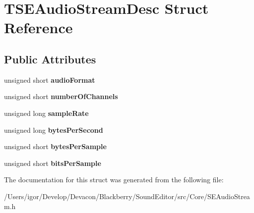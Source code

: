 \hypertarget{struct_t_s_e_audio_stream_desc}{\section{T\+S\+E\+Audio\+Stream\+Desc Struct Reference}
\label{struct_t_s_e_audio_stream_desc}
}
\subsection*{Public Attributes}
\begin{DoxyCompactItemize}
\item 
\hypertarget{struct_t_s_e_audio_stream_desc_a445b2e676e52f5a895210747cb799dde}{unsigned short {\bfseries audio\+Format}}\label{struct_t_s_e_audio_stream_desc_a445b2e676e52f5a895210747cb799dde}

\item 
\hypertarget{struct_t_s_e_audio_stream_desc_ae7893c4aaf66e0d9042bfda1ad602a21}{unsigned short {\bfseries number\+Of\+Channels}}\label{struct_t_s_e_audio_stream_desc_ae7893c4aaf66e0d9042bfda1ad602a21}

\item 
\hypertarget{struct_t_s_e_audio_stream_desc_a1088958be0c2d74002d679794ee4b334}{unsigned long {\bfseries sample\+Rate}}\label{struct_t_s_e_audio_stream_desc_a1088958be0c2d74002d679794ee4b334}

\item 
\hypertarget{struct_t_s_e_audio_stream_desc_ad90671d7b383c097807fd016938ff592}{unsigned long {\bfseries bytes\+Per\+Second}}\label{struct_t_s_e_audio_stream_desc_ad90671d7b383c097807fd016938ff592}

\item 
\hypertarget{struct_t_s_e_audio_stream_desc_ab9cc22ba2bca64941688daf573486d4f}{unsigned short {\bfseries bytes\+Per\+Sample}}\label{struct_t_s_e_audio_stream_desc_ab9cc22ba2bca64941688daf573486d4f}

\item 
\hypertarget{struct_t_s_e_audio_stream_desc_a4ea25ab0e18b87816731c4b4eab40b52}{unsigned short {\bfseries bits\+Per\+Sample}}\label{struct_t_s_e_audio_stream_desc_a4ea25ab0e18b87816731c4b4eab40b52}

\end{DoxyCompactItemize}


The documentation for this struct was generated from the following file\+:\begin{DoxyCompactItemize}
\item 
/\+Users/igor/\+Develop/\+Devacon/\+Blackberry/\+Sound\+Editor/src/\+Core/S\+E\+Audio\+Stream.\+h\end{DoxyCompactItemize}
